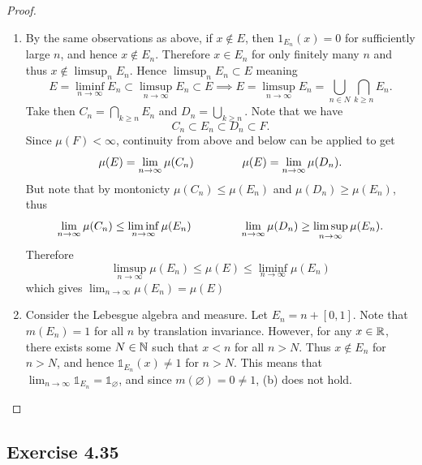 \documentclass[hw_all.tex]{subfiles}
\begin{document}
\begin{proof}
\begin{enumerate}
        \item 
            By the same observations as above, if $x \notin E$, then $1_{E_n}(x) = 0$ for sufficiently large $n$, and hence $x \notin E_n$. Therefore $x \in E_n$ for only finitely many $n$ and thus $x \notin \limsup_{n} E_n$. Hence $\limsup_{n} E_n \subset E$ meaning
            \[
                E = \liminf_{n \to \infty} E_n \subset \limsup_{n \to \infty} E_n \subset E \implies E = \limsup_{n \to \infty} E_n = \bigcup_{n \in N} \bigcap_{k \geq n} E_n
            .\]
            Take then $C_n = \bigcap_{k \geq n} E_n$ and $D_n = \bigcup_{k \geq n}$. Note that we have
            \[
                C_n \subset E_n \subset D_n \subset F
            .\]
            Since $\mu(F) < \infty$, continuity from above and below can be applied to get
            \[
                \mu(E) = \lim_{n \to \infty} \mu(C_n) \hspace{1.5cm} \mu(E) = \lim_{n \to \infty} \mu(D_n)
            .\]
            But note that by montonicty $\mu(C_n) \leq \mu(E_n)$ and $\mu(D_n) \geq \mu(E_n)$, thus
            \[
                \lim_{n \to \infty} \mu(C_n) \leq \liminf_{n \to \infty} \mu(E_n) \hspace{1.5cm} \lim_{n \to \infty} \mu(D_n) \geq \limsup_{n \to \infty} \mu(E_n)
            .\]
            Therefore
            \[
                \limsup_{n \to \infty} \mu(E_n) \leq \mu(E) \leq \liminf_{n \to \infty} \mu(E_n)
            \]
            which gives $\lim_{n \to \infty} \mu(E_n) = \mu(E)$
        \item 
            Consider the Lebesgue algebra and measure. Let $E_n = n + [0,1]$. Note that $m(E_n) = 1$ for all $n$ by translation invariance. However, for any $x \in \mathbb{R}$, there exists some $N \in \mathbb{N}$ such that $x < n$ for all $n > N$. Thus $x \notin E_n$ for $n > N$, and hence $\mathds{1}_{E_n}(x) \neq 1$ for $n > N$. This means that $\lim_{n \to \infty} \mathds{1}_{E_n} = \mathds{1}_{\varnothing}$, and since $m(\varnothing) = 0 \neq 1$, (b) does not hold.
    \end{enumerate}
\end{proof}

\subsection{Exercise 4.35}
\end{document}
